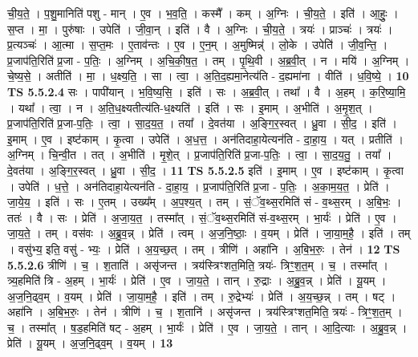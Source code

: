 \documentclass[17pt]{extarticle}
\begin{document}
                  ची॒य॒ते॒ । प॒शु॒मानिति॑ पशु - मान् । ए॒व । भ॒व॒ति॒ । कस्मै᳚ । कम् । अ॒ग्निः । ची॒य॒ते॒ । इति॑ । आ॒हुः॒ । स॒प्त । मा॒ । पुरु॑षाः । उपेति॑ । जी॒वा॒न् । इति॑ । वै । अ॒ग्निः । ची॒य॒ते॒ । त्रयः॑ । प्राञ्चः॑ । त्रयः॑ । प्र॒त्यञ्चः॑ । आ॒त्मा । स॒प्त॒मः । ए॒ताव॑न्तः । ए॒व । ए॒न॒म् । अ॒मुष्मिन्न्॑ । लो॒के । उपेति॑ । जी॒व॒न्ति॒ । प्र॒जाप॑ति॒रिति॑ प्र॒जा - प॒तिः॒ । अ॒ग्निम् । अ॒चि॒की॒ष॒त॒ । तम् । पृ॒थि॒वी । अ॒ब्र॒वी॒त् । न । मयि॑ । अ॒ग्निम् । चे॒ष्य॒से॒ । अतीति॑ । मा॒ । ध॒क्ष्य॒ति॒ । सा । त्वा॒ । अ॒ति॒द॒ह्यमा॒नेत्य॑ति - द॒ह्यमा॑ना । वीति॑ । ध॒वि॒ष्ये॒ । \textbf{  10} \newline
                  \newline
                                \textbf{ TS 5.5.2.4} \newline
                  सः । पापी॑यान् । भ॒वि॒ष्य॒सि॒ । इति॑ । सः । अ॒ब्र॒वी॒त् । तथा᳚ । वै । अ॒हम् । क॒रि॒ष्या॒मि॒ । यथा᳚ । त्वा॒ । न । अ॒ति॒ध॒क्ष्यतीत्य॑ति-ध॒क्ष्यति॑ । इति॑ । सः । इ॒माम् । अ॒भीति॑ । अ॒मृ॒श॒त् । प्र॒जाप॑ति॒रिति॑ प्र॒जा-प॒तिः॒ । त्वा॒ । सा॒द॒य॒त॒ । तया᳚ । दे॒वत॑या । अ॒ङ्गि॒र॒स्वत् । ध्रु॒वा । सी॒द॒ । इति॑ । इ॒माम् । ए॒व । इष्ट॑काम् । कृ॒त्वा । उपेति॑ । अ॒ध॒त्त॒ । अन॑तिदाहा॒येत्यन॑ति - दा॒हा॒य॒ । यत् । प्रतीति॑ । अ॒ग्निम् । चि॒न्वी॒त । तत् । अ॒भीति॑ । मृ॒शे॒त् । प्र॒जाप॑ति॒रिति॑ प्र॒जा-प॒तिः॒ । त्वा॒ । सा॒द॒य॒तु॒ । तया᳚ । दे॒वत॑या । अ॒ङ्गि॒र॒स्वत् । ध्रु॒वा । सी॒द॒ । \textbf{  11} \newline
                  \newline
                                \textbf{ TS 5.5.2.5} \newline
                  इति॑ । इ॒माम् । ए॒व । इष्ट॑काम् । कृ॒त्वा । उपेति॑ । ध॒त्ते॒ । अन॑तिदाहा॒येत्यन॑ति - दा॒हा॒य॒ । प्र॒जाप॑ति॒रिति॑ प्र॒जा - प॒तिः॒ । अ॒का॒म॒य॒त॒ । प्रेति॑ । जा॒ये॒य॒ । इति॑ । सः । ए॒तम् । उख्य᳚म् । अ॒प॒श्य॒त् । तम् । सं॒ॅव॒थ्स॒रमिति॑ सं - व॒थ्स॒रम् । अ॒बि॒भः॒ । ततः॑ । वै । सः । प्रेति॑ । अ॒जा॒य॒त॒ । तस्मा᳚त् । सं॒ॅव॒थ्स॒रमिति॑ सं-व॒थ्स॒रम् । भा॒र्यः॑ । प्रेति॑ । ए॒व । जा॒य॒ते॒ । तम् । वस॑वः । अ॒ब्रु॒व॒न्न् । प्रेति॑ । त्वम् । अ॒ज॒नि॒ष्ठाः॒ । व॒यम् । प्रेति॑ । जा॒या॒म॒है॒ । इति॑ । तम् । वसु॑भ्य॒ इति॒ वसु॑ - भ्यः॒ । प्रेति॑ । अ॒य॒च्छ॒त् । तम् । त्रीणि॑ । अहा॑नि । अ॒बि॒भ॒रुः॒ । तेन॑ । \textbf{  12} \newline
                  \newline
                                \textbf{ TS 5.5.2.6} \newline
                  त्रीणि॑ । च॒ । श॒ताति॑ । असृ॑जन्त । त्रय॑स्त्रिꣳशत॒मिति॒ त्रयः॑- त्रिꣳ॒॒श॒त॒म् । च॒ । तस्मा᳚त् । त्र्य॒हमिति॑ त्रि - अ॒हम् । भा॒र्यः॑ । प्रेति॑ । ए॒व । जा॒य॒ते॒ । तान् । रु॒द्राः । अ॒ब्रु॒व॒न्न् । प्रेति॑ । यू॒यम् । अ॒ज॒नि॒ढ्व॒म् । व॒यम् । प्रेति॑ । जा॒या॒म॒है॒ । इति॑ । तम् । रु॒द्रेभ्यः॑ । प्रेति॑ । अ॒य॒च्छ॒न्न् । तम् । षट् । अहा॑नि । अ॒बि॒भ॒रुः॒ । तेन॑ । त्रीणि॑ । च॒ । श॒तानि॑ । असृ॑जन्त । त्रय॑स्त्रिꣳशत॒मिति॒ त्रयः॑ - त्रिꣳ॒॒श॒त॒म् । च॒ । तस्मा᳚त् । ष॒ड॒हमिति॑ षट् - अ॒हम् । भा॒र्यः॑ । प्रेति॑ । ए॒व । जा॒य॒ते॒ । तान् । आ॒दि॒त्याः । अ॒ब्रु॒व॒न्न् । प्रेति॑ । यू॒यम् । अ॒ज॒नि॒ढ्व॒म् । व॒यम् । \textbf{  13} \newline
\end{document}
